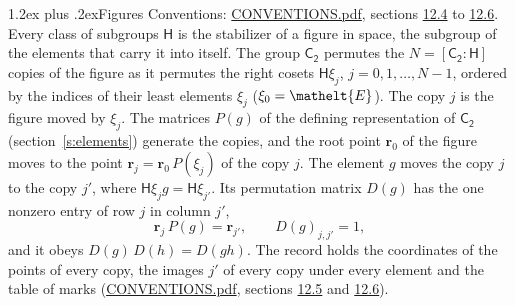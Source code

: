 \documentclass[10pt,a4paper]{article}
\makeatletter
\renewcommand\section{\@startsection{section}{1}{\z@}{-3ex plus -1ex minus -.2ex}%
  {1.2ex plus .2ex}{\normalfont\large\sffamily\bfseries\color{parttitle}}}
\numberwithin{equation}{section}
\newcommand{\eltfont}[1]{{\let\sigma\eltsigma\mathelt{#1}}}
\newcommand{\grp}[1]{\mathsf{#1}}
\newcommand{\cls}[1]{\eltfont{#1}}
\newcommand{\pointr}{\mathbf{r}}
\makeatother
\begin{document}
\section{Figures}\label{s:permutation}
Conventions: \href{../../CONVENTIONS.pdf}{CONVENTIONS.pdf}, sections \href{../../CONVENTIONS.pdf\#conv.12.4}{12.4} to \href{../../CONVENTIONS.pdf\#conv.12.6}{12.6}.
Every class of subgroups $\grp{H}$ is the stabilizer of a figure in space, the subgroup of the elements that carry it into itself. \label{n:local.orbit.size}\label{n:element.coset.least}\label{n:index.coset}The group $\grp{C_{2}}$ permutes the $N = [\grp{C_{2}} : \grp{H}]$ copies of the figure as it permutes the right cosets $\grp{H}\xi_j$, $j = 0, 1, \dots, N - 1$, ordered by the indices of their least elements $\xi_j$ ($\xi_0 = \cls{E}$). The copy $j$ is the figure moved by $\xi_j$. The matrices $P(g)$ of the defining representation of $\grp{C_{2}}$ (section~\ref{s:elements}) generate the copies, and the root point $\pointr_0$ of the figure moves to the point $\pointr_j = \pointr_0\, P(\xi_j)$ of the copy $j$. \label{n:local.coset.image}The element $g$ moves the copy $j$ to the copy $j'$, where $\grp{H}\xi_j g = \grp{H}\xi_{j'}$. \label{n:local.matrix.permutation}Its permutation matrix $D(g)$ has the one nonzero entry of row $j$ in column $j'$,
\begin{equation}\label{e:perm.matrix}\pointr_j\, P(g) = \pointr_{j'}, \qquad D(g)_{j,j'} = 1,\end{equation}
and it obeys $D(g)\, D(h) = D(gh)$. The record holds the coordinates of the points of every copy, the images $j'$ of every copy under every element and the table of marks (\href{../../CONVENTIONS.pdf}{CONVENTIONS.pdf}, sections \href{../../CONVENTIONS.pdf\#conv.12.5}{12.5} and \href{../../CONVENTIONS.pdf\#conv.12.6}{12.6}).
\end{document}
